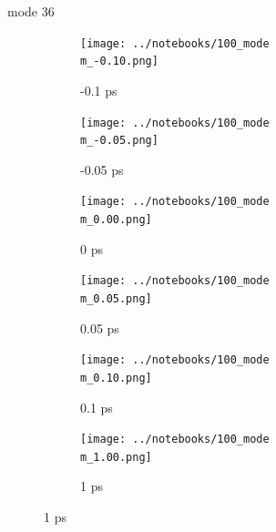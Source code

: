 \documentclass{beamer}
\newcommand\w{0.32}
\begin{document}
\renewcommand\m{36}
\begin{frame}{mode \m}
	\begin{figure}
		\centering
		\begin{subfigure}[b]{\w\textwidth}
			\centering
			\texttt{[image: ../notebooks/100\_mode\\m\_-0.10.png]}
			\caption{-0.1 ps}
		\end{subfigure}
		\begin{subfigure}[b]{\w\textwidth}
			\centering
			\texttt{[image: ../notebooks/100\_mode\\m\_-0.05.png]}
			\caption{-0.05 ps}
		\end{subfigure}
		\begin{subfigure}[b]{\w\textwidth}
			\centering
			\texttt{[image: ../notebooks/100\_mode\\m\_0.00.png]}
			\caption{0 ps}
		\end{subfigure}
		\begin{subfigure}[b]{\w\textwidth}
			\centering
			\texttt{[image: ../notebooks/100\_mode\\m\_0.05.png]}
			\caption{0.05 ps}
		\end{subfigure}
		\begin{subfigure}[b]{\w\textwidth}
			\centering
			\texttt{[image: ../notebooks/100\_mode\\m\_0.10.png]}
			\caption{0.1 ps}
		\end{subfigure}
		\begin{subfigure}[b]{\w\textwidth}
			\centering
			\texttt{[image: ../notebooks/100\_mode\\m\_1.00.png]}
			\caption{1 ps}
		\end{subfigure}
	\end{figure}
\end{frame}
\end{document}
